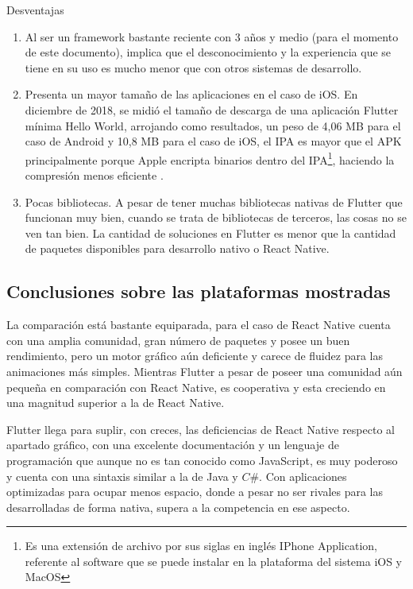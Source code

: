 Desventajas
\begin{enumerate}


\item	Al ser un framework bastante reciente con 3 años y medio (para el momento de este documento), implica que el desconocimiento y la experiencia que se tiene en su uso es mucho menor que con otros sistemas de desarrollo.
\item	Presenta un mayor tamaño de las aplicaciones en el caso de iOS. En diciembre de 2018, se midió el tamaño de descarga de una aplicación Flutter mínima Hello World, arrojando como resultados, un peso de 4,06 MB para el caso de Android y 10,8 MB para el caso de iOS, el IPA  es mayor que el APK principalmente porque Apple encripta binarios dentro del IPA\footnote{Es una extensión de archivo por sus siglas en inglés IPhone Application, referente al software que se puede instalar en la plataforma del sistema iOS y MacOS}, haciendo la compresión menos eficiente .
\item	Pocas bibliotecas. A pesar de tener muchas bibliotecas nativas de Flutter que funcionan muy bien, cuando se trata de bibliotecas de terceros, las cosas no se ven tan bien. La cantidad de soluciones en Flutter es menor que la cantidad de paquetes disponibles para desarrollo nativo o React Native.
\end{enumerate}

\subsection{Conclusiones sobre las plataformas mostradas}\label{chapter:introduction}

La comparación está bastante equiparada, para el caso de React Native cuenta con una amplia comunidad, gran número de paquetes y posee un buen rendimiento, pero un motor gráfico aún deficiente y carece de fluidez para las animaciones más simples. Mientras Flutter a pesar de poseer una comunidad aún pequeña en comparación con React Native, es cooperativa y esta creciendo en una magnitud superior a la de React Native.

Flutter llega para suplir, con creces, las deficiencias de React Native respecto al apartado gráfico, con una excelente documentación y un lenguaje de programación que aunque no es tan conocido como JavaScript, es muy poderoso y cuenta con una sintaxis similar a la de Java y $C\#$. Con aplicaciones optimizadas para ocupar menos espacio, donde a pesar no ser rivales para las desarrolladas de forma nativa, supera a la competencia en ese aspecto.

